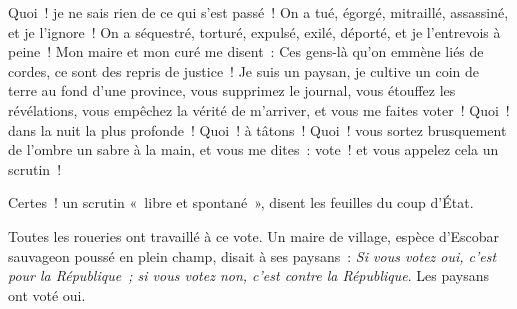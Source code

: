\documentclass[french,twoside]{book} %
\begin{document}
Quoi ! je ne sais rien de ce qui s’est passé ! On a tué, égorgé, mitraillé, assassiné, et je l’ignore ! On a séquestré, torturé, expulsé, exilé, déporté, et je l’entrevois à peine ! Mon maire et mon curé me disent : Ces gens-là qu’on emmène liés de cordes, ce sont des repris de justice ! Je suis un paysan, je cultive un coin de terre au fond d’une province, vous supprimez le journal, vous étouffez les révélations, vous empêchez la vérité de m’arriver, et vous me faites voter ! Quoi ! dans la nuit la plus profonde ! Quoi ! à tâtons ! Quoi ! vous sortez brusquement de l’ombre un sabre à la main, et vous me dites : vote ! et vous appelez cela un scrutin !\par
Certes ! un scrutin « libre et spontané », disent les feuilles du coup d’État.\par
Toutes les roueries ont travaillé à ce vote. Un maire de village, espèce d’Escobar sauvageon poussé en plein champ, disait à ses paysans : \emph{Si vous votez oui, c’est pour la République ; si vous votez non, c’est contre la République}. Les paysans ont voté oui.\par
\end{document}
